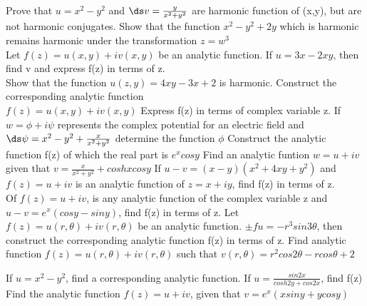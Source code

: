 \prob Prove that $ u = x^2-y^2$ and $\ds v=\frac{y}{x^2+y^2}$ are harmonic function of (x,y), but are not harmonic conjugates.
\prob  Show that the function $x^2-y^2+2y$ which is harmonic remains harmonic under the transformation $z=w^3$ \\
\prob Let $f(z)=u(x,y)+iv(x,y)$ be an analytic function. If $u=3x-2xy$, then find v and express f(z) in terms of z. \\
\prob Show that the function $u(z,y) = 4xy-3x +2$ is harmonic. Construct the corresponding analytic function \\
$f(z) =u(x,y) + iv(x,y)$ 
Express f(z) in terms of complex variable z. 
\prob  If $w=\phi+i\psi$ represents the complex potential for an electric field and 
$\ds\psi =  x^2-y^2+\frac{x}{x^2+y^2}$ 
determine the function $\phi$ 
\prob Construct the analytic function f(z) of which the real part is $e^x cosy$ 
\prob  Find an analytic funtion $w=u+iv$ given that 
$v = \frac{x}{x^2+y^2} + cosh xcosy$ 
\prob  If $u-v = (x-y) (x^2+4xy+y^2)$ and $f(z)=u+iv$ is an analytic function of $z=x+iy$, find f(z) in terms of z. \\
\prob  Of $f(z)=u+iv$, is any analytic function of the complex variable z and $u-v=e^x(cos y- sin y)$, find f(z) in terms of z. 
\prob  Let $f(z) =u(r,\theta) +iv(r,\theta)$ be an analytic function. $\pm fu = -r^3 sin 3\theta$, then construct the corresponding analytic function f(z) in terms of z. 
\prob  Find analytic function $f(z)=u(r,\theta)+iv(r,\theta)$ such that 
$v(r,\theta) = r^2 cos 2\theta -r cos \theta +2$ 
 
\prob  If $u=x^2-y^2$, find a corresponding analytic function. 
\prob  If $u= \frac{sin 2x}{cosh 2y+cos 2x}$, find f(z) 
\prob  Find the analytic function $f(z)=u+iv$, given that $v=e^x(x sin y + y cos y)$ 



